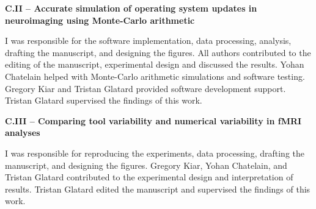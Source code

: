 \textbf{C.II – Accurate simulation of operating system updates in neuroimaging using Monte-Carlo arithmetic}

I was responsible for the software implementation, data processing, analysis, drafting the manuscript, and designing the figures.
All authors contributed to the editing of the manuscript, experimental design and discussed the results.
Yohan Chatelain helped with Monte-Carlo arithmetic simulations and software testing.
Gregory Kiar and Tristan Glatard provided software development support.
Tristan Glatard supervised the findings of this work.

\textbf{C.III – Comparing tool variability and numerical variability in fMRI analyses}

I was responsible for reproducing the experiments, data processing, drafting the manuscript, and designing the figures.
Gregory Kiar, Yohan Chatelain, and Tristan Glatard contributed to the experimental design and interpretation of results.
Tristan Glatard edited the manuscript and supervised the findings of this work.

